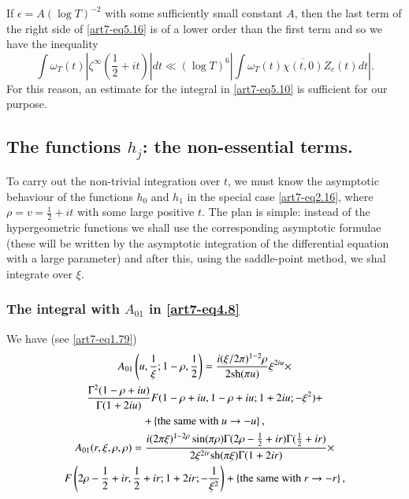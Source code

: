 If $\epsilon = A(\log T)^{-2}$ with some sufficiently small constant $A$, then the last term of the right side of \eqref{art7-eq5.16} is of a lower order than the first term and so we have the inequality
\begin{equation}
\int \omega_T (t) |\zeta^\infty(\frac{1}{2} + it)| dt \ll (\log T)^6 |\int \omega_T (t) \overline{\chi (t, 0)} Z_c (t) dt|. \label{art7-eq5.17}
\end{equation}
For this reason, an estimate for the integral in \eqref{art7-eq5.10} is sufficient for our purpose.

\setcounter{section}{2}
\subsection{The functions $h_j$: the non-essential terms.}\label{art7-subsec2.5}
To carry out the non-trivial integration over $t$, we must know the asymptotic behaviour of the functions $h_0$ and $h_1$ in the special case \eqref{art7-eq2.16}, where $\rho = v = \frac{1}{2} + it$ with some large positive $t$. The plan is simple: instead of the hypergeometric functions we shall use the corresponding asymptotic formulae (these will be written by the asymptotic integration of the differential equation with a large parameter) and after this, using the saddle-point method, we shal integrate over $\xi$.

\subsubsection{The integral with $A_{01}$ in \eqref{art7-eq4.8}}\label{art7-subsubsec2.5.1}

\setcounter{section}{6}
\setcounter{equation}{0}
We have (see \eqref{art7-eq1.79})
\begin{gather}
A_{01} \left(u, \frac{1}{\xi}; 1 - \rho, \frac{1}{2} \right) = \frac{i(\xi/ 2 \pi)^{1-2} \rho}{2 \text{sh} (\pi u)} \xi^{2 i u} \times \label{art7-eq6.1}\\
\frac{\Gamma^2 (1-\rho + iu)}{\Gamma (1+ 2 iu)} F (1- \rho + iu, 1 - \rho + i u ; 1 + 2 i u ; - \xi^2) + \notag\\
+ \left\{\text{the same with } u \to -u \right\}, \notag\\
A_{01} (r, \xi, \rho, \rho) = \frac{i(2 \pi \xi)^{1-2\rho} \sin (\pi \rho) \Gamma (2 \rho - \frac{1}{2} + ir) \Gamma (\frac{1}{2} + ir)}{2 \xi^{2ir} \text{sh} (\pi \xi) \Gamma (1+ 2 ir)}  \times \label{art7-eq6.2}\\
F \left(2 \rho - \frac{1}{2} + ir , \frac{1}{2} + ir; 1 + 2 ir; -\frac{1}{\xi^2} \right) + \left\{\text{the same with } r \to - r \right\}, \notag
\end{gather}

